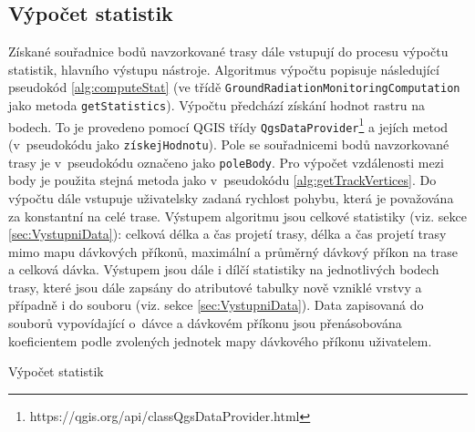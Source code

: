 \subsection{Výpočet statistik}
\label{subsec:vypocetStatistik} Získané souřadnice bodů navzorkované
trasy dále vstupují do procesu výpočtu statistik, hlavního výstupu
nástroje. Algoritmus výpočtu popisuje následující pseudokód
\ref{alg:computeStat} (ve třídě
\texttt{GroundRadiationMonitoringComputation} jako metoda
\texttt{getStatistics}). Výpočtu předchází získání hodnot rastru na
bodech. To je provedeno pomocí QGIS třídy
\texttt{QgsDataProvider}\footnote{https://qgis.org/api/classQgsDataProvider.html}
a jejích metod (v~pseudokódu jako \texttt{získejHodnotu}). Pole se
souřadnicemi bodů navzorkované trasy je v~pseudokódu označeno jako
\texttt{poleBody}. Pro výpočet vzdálenosti mezi body je použita stejná
metoda jako v~pseudokódu \ref{alg:getTrackVertices}. Do výpočtu dále
vstupuje uživatelsky zadaná rychlost pohybu, která je považována za
konstantní na celé trase. Výstupem algoritmu jsou celkové statistiky
(viz. sekce \ref{sec:VystupniData}): celková délka a čas projetí
trasy, délka a čas projetí trasy mimo mapu dávkových příkonů,
maximální a průměrný dávkový příkon na trase a celková dávka. Výstupem
jsou dále i dílčí statistiky na jednotlivých bodech trasy, které jsou
dále zapsány do atributové tabulky nově vzniklé vrstvy a případně i do
 souboru (viz. sekce \ref{sec:VystupniData}). Data zapisovaná
do souborů vypovídající o~dávce a dávkovém příkonu jsou přenásobována
koeficientem podle zvolených jednotek mapy dávkového příkonu
uživatelem.


\begin{algorithm}
\caption{Výpočet statistik}
\label{alg:computeStat}
	\begin{algorithmic}[1]  
 
 
 
 

		   \ELSE {}
			\ENDIF
			

  

		\end{algorithmic}
		\end{algorithm}

